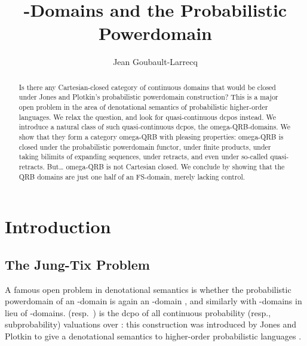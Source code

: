 \documentclass{LMCS}
\begin{document}
\title[QRB-Domains]{-Domains and the Probabilistic Powerdomain\rsuper*}

\author[J.~Goubault-Larrecq]{Jean Goubault-Larrecq}	\address{LSV, ENS Cachan, CNRS, INRIA, France}	  













\begin{abstract}
  Is there any Cartesian-closed category of continuous domains that
  would be closed under Jones and Plotkin's probabilistic powerdomain
  construction?  This is a major open problem in the area of
  denotational semantics of probabilistic higher-order languages.  We
  relax the question, and look for quasi-continuous dcpos instead.
We introduce a natural class of such quasi-continuous dcpos, the
  omega-QRB-domains.  We show that they form a category omega-QRB with
  pleasing properties: omega-QRB is closed under the probabilistic
  powerdomain functor, under finite products, under taking bilimits of
  expanding sequences, under retracts, and even under so-called
  quasi-retracts.  But\ldots{} omega-QRB is not Cartesian closed.  We
  conclude by showing that the QRB domains are just one half of an
  FS-domain, merely lacking control.
\end{abstract}

\maketitle




\section{Introduction}
\label{sec:intro}

\subsection{The Jung-Tix Problem}
A famous open problem in denotational semantics is whether the
probabilistic powerdomain  of an -domain  is again
an -domain \cite{JT:troublesome}, and similarly with
-domains in lieu of -domains.   (resp.\
) is the dcpo of all continuous probability (resp.,
subprobability) valuations over : this construction was introduced
by Jones and Plotkin to give a denotational semantics to higher-order
probabilistic languages \cite{JP:proba}.
\end{document}
